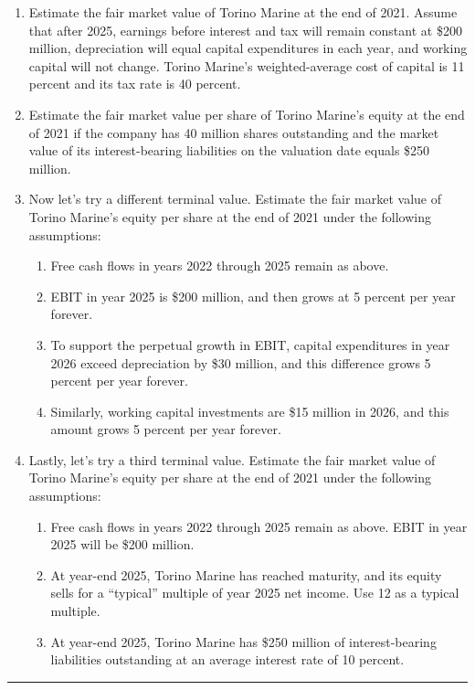 \documentclass[11pt,a4paper]{article}
\numberwithin{equation}{section}
\newcommand{\stmtend}{\par\endgroup\nopagebreak\noindent\rule{\linewidth}{0.4pt}\par\medskip}
\begin{document}
\begin{enumerate}
\def\labelenumi{\alph{enumi}.}
\item
  Estimate the fair market value of Torino Marine at the end of 2021. Assume that after 2025,
  earnings before interest and tax will remain constant at \$200 million, depreciation will equal
  capital expenditures in each year, and working capital will not change. Torino Marine's
  weighted-average cost of capital is 11 percent and its tax rate is 40 percent.
\item
  Estimate the fair market value per share of Torino Marine's equity at the end of 2021 if the
  company has 40 million shares outstanding and the market value of its interest-bearing liabilities
  on the valuation date equals \$250 million.
\item
  Now let's try a different terminal value. Estimate the fair market value of Torino Marine's equity
  per share at the end of 2021 under the following assumptions:

  \begin{enumerate}
  \def\labelenumii{\roman{enumii}.}
  \item
    Free cash flows in years 2022 through 2025 remain as above.
  \item
    EBIT in year 2025 is \$200 million, and then grows at 5 percent per year forever.
  \item
    To support the perpetual growth in EBIT, capital expenditures in year 2026 exceed depreciation
    by \$30 million, and this difference grows 5 percent per year forever.
  \item
    Similarly, working capital investments are \$15 million in 2026, and this amount grows 5 percent
    per year forever.
  \end{enumerate}
\item
  Lastly, let's try a third terminal value. Estimate the fair market value of Torino Marine's equity
  per share at the end of 2021 under the following assumptions:

  \begin{enumerate}
  \def\labelenumii{\roman{enumii}.}
  \item
    Free cash flows in years 2022 through 2025 remain as above. EBIT in year 2025 will be \$200
    million.
  \item
    At year-end 2025, Torino Marine has reached maturity, and its equity sells for a ``typical''
    multiple of year 2025 net income. Use 12 as a typical multiple.
  \item
    At year-end 2025, Torino Marine has \$250 million of interest-bearing liabilities outstanding at
    an average interest rate of 10 percent.
  \end{enumerate}
\end{enumerate}
\stmtend
\end{document}

